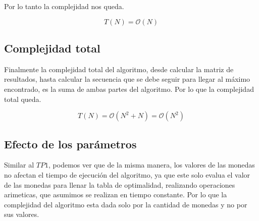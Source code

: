 Por lo tanto la complejidad nos queda.

\[
T(N) = \mathcal{O}(N)
\]

\subsection{Complejidad total}

Finalmente la complejidad total del algoritmo, desde calcular la matriz de resultados, hasta calcular la secuencia que se debe seguir para llegar al máximo encontrado, es la suma de ambas partes del algoritmo. Por lo que la complejidad total queda.

\[
T(N) = \mathcal{O}(N^2 + N) = \mathcal{O}(N^2)
\]

\subsection{Efecto de los parámetros}

Similar al $TP1$, podemos ver que de la misma manera, los valores de las monedas no afectan el tiempo de ejecución del algoritmo, ya que este solo evalua el valor de las monedas para llenar la tabla de optimalidad, realizando operaciones arimeticas, que asumimos se realizan en tiempo constante. Por lo que la complejidad del algoritmo esta dada solo por la cantidad de monedas y no por sus valores.